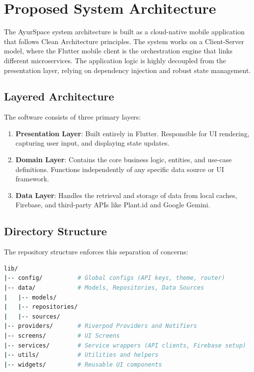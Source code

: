 \newpage
\section{Proposed System Architecture}
\justify
The AyurSpace system architecture is built as a cloud-native mobile application that follows Clean Architecture principles. The system works on a Client-Server model, where the Flutter mobile client is the orchestration engine that links different microservices. The application logic is highly decoupled from the presentation layer, relying on dependency injection and robust state management.

\subsection{Layered Architecture}
The software consists of three primary layers:
\begin{enumerate}
    \item \textbf{Presentation Layer}: Built entirely in Flutter. Responsible for UI rendering, capturing user input, and displaying state updates.
    \item \textbf{Domain Layer}: Contains the core business logic, entities, and use-case definitions. Functions independently of any specific data source or UI framework.
    \item \textbf{Data Layer}: Handles the retrieval and storage of data from local caches, Firebase, and third-party APIs like Plant.id and Google Gemini.
\end{enumerate}

\subsection{Directory Structure}
The repository structure enforces this separation of concerns:
\begin{lstlisting}[language=bash]
lib/
|-- config/          # Global configs (API keys, theme, router)
|-- data/            # Models, Repositories, Data Sources
|   |-- models/
|   |-- repositories/
|   |-- sources/
|-- providers/       # Riverpod Providers and Notifiers
|-- screens/         # UI Screens
|-- services/        # Service wrappers (API clients, Firebase setup)
|-- utils/           # Utilities and helpers
|-- widgets/         # Reusable UI components
\end{lstlisting}

